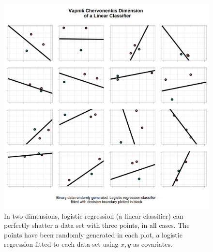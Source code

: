 \begin{figure}[h]
    \centering
    \includegraphics[width=120mm]{figs/vc_3.png}
    \caption[\Gls{vc} dimension of a linear classifier - the data is shattered.]{In two dimensions, logistic regression (a linear classifier) can perfectly shatter a data set with three points, in all cases. The points have been randomly generated in each plot, a logistic regression fitted to each data set using $x, y$ as covariates.}
    \label{fig:vc_3}
\end{figure}

